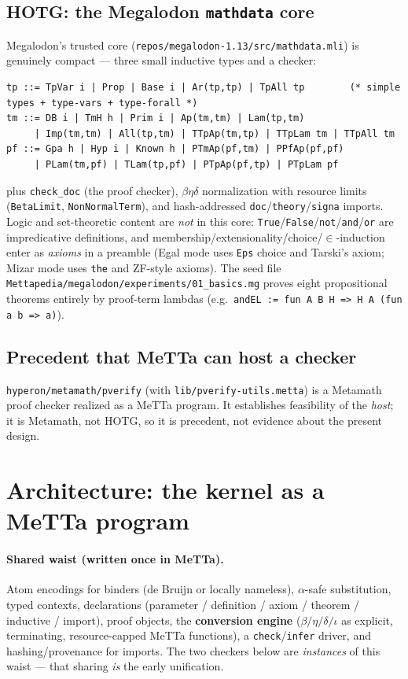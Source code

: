\documentclass[11pt]{article}
\newcommand{\MeTTa}{MeTTa}
\newcommand{\HOTG}{HOTG}
\newcommand{\code}[1]{\texttt{#1}}
\begin{document}
\subsection{\HOTG{}: the Megalodon \code{mathdata} core}
Megalodon's trusted core (\code{repos/megalodon-1.13/src/mathdata.mli}) is genuinely
compact --- three small inductive types and a checker:
\begin{lstlisting}
tp ::= TpVar i | Prop | Base i | Ar(tp,tp) | TpAll tp        (* simple types + type-vars + type-forall *)
tm ::= DB i | TmH h | Prim i | Ap(tm,tm) | Lam(tp,tm)
     | Imp(tm,tm) | All(tp,tm) | TTpAp(tm,tp) | TTpLam tm | TTpAll tm
pf ::= Gpa h | Hyp i | Known h | PTmAp(pf,tm) | PPfAp(pf,pf)
     | PLam(tm,pf) | TLam(tp,pf) | PTpAp(pf,tp) | PTpLam pf
\end{lstlisting}
{\raggedright
plus \code{check\_doc} (the proof checker), $\beta\eta\delta$ normalization with
resource limits (\code{BetaLimit}, \code{NonNormalTerm}), and hash-addressed
\code{doc}/\code{theory}/\code{signa} imports. Logic and set-theoretic content are
\emph{not} in this core: \code{True}/\code{False}/\code{not}/\code{and}/\code{or}
are impredicative definitions, and membership/extensionality/choice/$\in$-induction
enter as \emph{axioms} in a preamble (Egal mode uses \code{Eps} choice and Tarski's
axiom; Mizar mode uses \code{the} and ZF-style axioms). The seed file
\code{Mettapedia/megalodon/experiments/01\_basics.mg} proves eight propositional
theorems entirely by proof-term lambdas (e.g.\
\code{andEL := fun A B H => H A (fun a b => a)}).
\par}

\subsection{Precedent that \MeTTa{} can host a checker}
\code{hyperon/metamath/pverify} (with \code{lib/pverify-utils.metta}) is a Metamath
proof checker realized as a \MeTTa{} program. It establishes feasibility of the
\emph{host}; it is Metamath, not \HOTG{}, so it is precedent, not evidence about the
present design.

\section{Architecture: the kernel as a \MeTTa{} program}
\label{sec:arch}

\paragraph{Shared waist (written once in \MeTTa{}).} Atom encodings for binders
(de Bruijn or locally nameless), $\alpha$-safe substitution, typed contexts,
declarations (parameter / definition / axiom / theorem / inductive / import), proof
objects, the \textbf{conversion engine} ($\beta/\eta/\delta/\iota$ as explicit,
terminating, resource-capped \MeTTa{} functions), a \code{check}/\code{infer}
driver, and hashing/provenance for imports. The two checkers below are
\emph{instances} of this waist --- that sharing \emph{is} the early unification.
\end{document}
